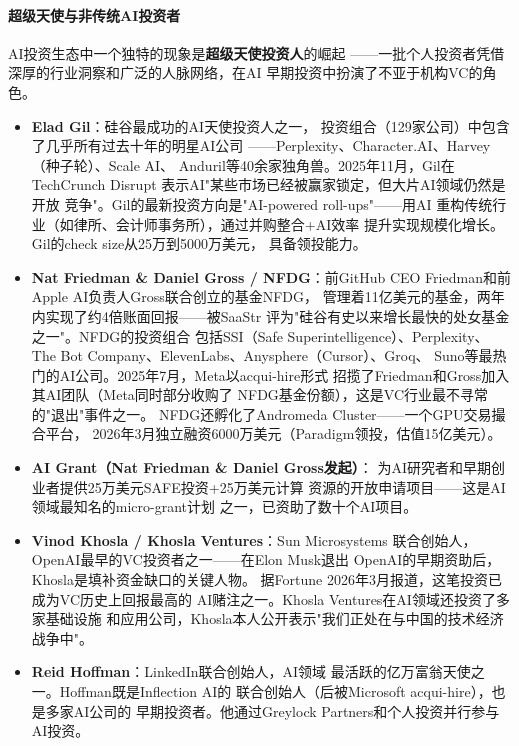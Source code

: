 \paragraph{超级天使与非传统AI投资者}

AI投资生态中一个独特的现象是\textbf{超级天使投资人}的崛起
——一批个人投资者凭借深厚的行业洞察和广泛的人脉网络，在AI
早期投资中扮演了不亚于机构VC的角色。

\begin{itemize}
  \item \textbf{Elad Gil}：硅谷最成功的AI天使投资人之一，
    投资组合（129家公司）中包含了几乎所有过去十年的明星AI公司
    ——Perplexity、Character.AI、Harvey（种子轮）、Scale AI、
    Anduril等40余家独角兽。2025年11月，Gil在TechCrunch Disrupt
    表示AI"某些市场已经被赢家锁定，但大片AI领域仍然是开放
    竞争"。Gil的最新投资方向是"AI-powered roll-ups"——用AI
    重构传统行业（如律所、会计师事务所），通过并购整合+AI效率
    提升实现规模化增长。Gil的check size从25万到5000万美元，
    具备领投能力。
  \item \textbf{Nat Friedman \& Daniel Gross / NFDG}：前GitHub
    CEO Friedman和前Apple AI负责人Gross联合创立的基金NFDG，
    管理着11亿美元的基金，两年内实现了约4倍账面回报——被SaaStr
    评为"硅谷有史以来增长最快的处女基金之一"。NFDG的投资组合
    包括SSI（Safe Superintelligence）、Perplexity、
    The Bot Company、ElevenLabs、Anysphere（Cursor）、Groq、
    Suno等最热门的AI公司。2025年7月，Meta以acqui-hire形式
    招揽了Friedman和Gross加入其AI团队（Meta同时部分收购了
    NFDG基金份额），这是VC行业最不寻常的"退出"事件之一。
    NFDG还孵化了Andromeda Cluster——一个GPU交易撮合平台，
    2026年3月独立融资6000万美元（Paradigm领投，估值15亿美元）。
  \item \textbf{AI Grant（Nat Friedman \& Daniel Gross发起）}：
    为AI研究者和早期创业者提供25万美元SAFE投资+25万美元计算
    资源的开放申请项目——这是AI领域最知名的micro-grant计划
    之一，已资助了数十个AI项目。
  \item \textbf{Vinod Khosla / Khosla Ventures}：Sun Microsystems
    联合创始人，OpenAI最早的VC投资者之一——在Elon Musk退出
    OpenAI的早期资助后，Khosla是填补资金缺口的关键人物。
    据Fortune 2026年3月报道，这笔投资已成为VC历史上回报最高的
    AI赌注之一。Khosla Ventures在AI领域还投资了多家基础设施
    和应用公司，Khosla本人公开表示"我们正处在与中国的技术经济
    战争中"。
  \item \textbf{Reid Hoffman}：LinkedIn联合创始人，AI领域
    最活跃的亿万富翁天使之一。Hoffman既是Inflection AI的
    联合创始人（后被Microsoft acqui-hire），也是多家AI公司的
    早期投资者。他通过Greylock Partners和个人投资并行参与
    AI投资。
\end{itemize}

